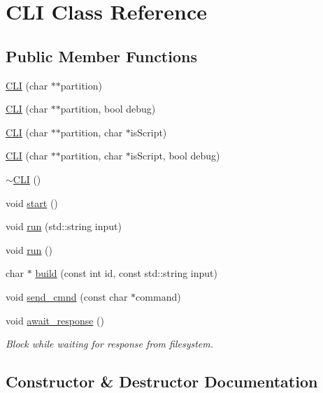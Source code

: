 \hypertarget{classCLI}{}\section{C\+LI Class Reference}
\label{classCLI}
\subsection*{Public Member Functions}
\begin{DoxyCompactItemize}
\item 
\hyperlink{classCLI_a0c3b5662a3f33b5a76021be177c3eef2}{C\+LI} (char $\ast$$\ast$partition)
\item 
\hyperlink{classCLI_aeafaa56f2b2d8c97121ed52125e3fa9a}{C\+LI} (char $\ast$$\ast$partition, bool debug)
\item 
\hyperlink{classCLI_a4eb5e9a1c695edf4dcc705b9c12a0a8d}{C\+LI} (char $\ast$$\ast$partition, char $\ast$is\+Script)
\item 
\hyperlink{classCLI_a5d9746160fc642addd9b4aff6cc4eef2}{C\+LI} (char $\ast$$\ast$partition, char $\ast$is\+Script, bool debug)
\item 
\hyperlink{classCLI_a9f59d57abf434f7161fcf3f61b725752}{$\sim$\+C\+LI} ()
\item 
void \hyperlink{classCLI_a1492005f186392031bd4d447cb20e975}{start} ()
\item 
void \hyperlink{classCLI_a5ce3ce0818fc0afe2a277995000ea22b}{run} (std\+::string input)
\item 
void \hyperlink{classCLI_aeefc8cd81999836a90c2cfaced6177f1}{run} ()
\item 
char $\ast$ \hyperlink{classCLI_a6c3f97b04646b070ad82801adf0dc521}{build} (const int id, const std\+::string input)
\item 
void \hyperlink{classCLI_a1d25fcb18cf42e03a7e38c24a8ba1506}{send\+\_\+cmnd} (const char $\ast$command)
\item 
void \hyperlink{classCLI_a87c68e5edcb5750d1199839e6b1f843e}{await\+\_\+response} ()
\begin{DoxyCompactList}\small\item\em Block while waiting for response from filesystem. \end{DoxyCompactList}\end{DoxyCompactItemize}


\subsection{Constructor \& Destructor Documentation}
